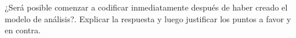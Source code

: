 ¿Será posible comenzar a codificar inmediatamente después de haber creado el modelo de análisis?. Explicar la respuesta y luego justificar los puntos a favor y en contra.
